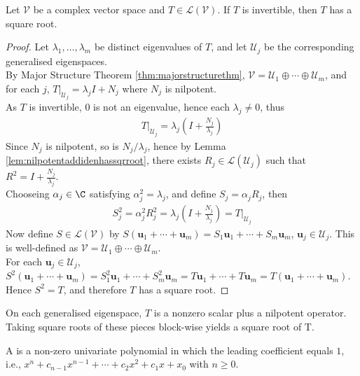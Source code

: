 \begin{theorem} Let $\mathcal{V}$ be a complex vector space and $T \in \mathcal{L}(\mathcal{V})$. If $T$ is invertible, then $T$ has a square root.
\begin{proof} Let $\lambda_1, \ldots, \lambda_m$ be distinct eigenvalues of $T$, and let $\mathcal{U}_j$ be the corresponding generalised eigenspaces.\\
By Major Structure Theorem \ref{thm:majorstructurethm}, $\mathcal{V} = \mathcal{U}_1 \oplus \cdots \oplus \mathcal{U}_m$, and for each $j$, $T|_{\mathcal{U}_j} = \lambda_j I + N_j$ where $N_j$ is nilpotent.\\
 As $T$ is invertible, $0$ is not an eigenvalue, hence each $\lambda_j \neq 0$, thus
\begin{align}
T|_{\mathcal{U}_j} = \lambda_j \left(I + \frac{N_j}{\lambda_j} \right) \nonumber
\end{align}
Since $N_j$ is nilpotent, so is $N_j/\lambda_j$, hence by Lemma \ref{lem:nilpotentaddidenhassqrroot}, there exists $R_j \in \mathcal{L}(\mathcal{U}_j)$ such that $R^2 = I + \frac{N_j}{\lambda_j}$.\\
Chooseing $\alpha_j \in \C$ satisfying $\alpha_j^2 = \lambda_j$, and define $S_j = \alpha_j R_j$, then
\begin{align}
S_j^2 = \alpha_j^2 R_j^2 = \lambda_j \left( I + \frac{N_j}{\lambda_j} \right) = T|_{\mathcal{U}_j} \nonumber
\end{align}
Now define $S \in \mathcal{L}(\mathcal{V})$ by $S(\mathbf{u}_1 + \cdots + \mathbf{u}_m) = S_1 \mathbf{u}_1 + \cdots + S_m \mathbf{u}_m$, $\mathbf{u}_j \in \mathcal{U}_j$. This is well-defined as $\mathcal{V} = \mathcal{U}_1 \oplus \cdots \oplus \mathcal{U}_m$.\\
For each $\mathbf{u}_j \in \mathcal{U}_j$, $S^2(\mathbf{u}_1 + \cdots + \mathbf{u}_m) = S_1^2 \mathbf{u}_1 + \cdots + S_m^2 \mathbf{u}_m = T \mathbf{u}_1 + \cdots + T \mathbf{u}_m = T (\mathbf{u}_1 + \cdots + \mathbf{u}_m)$.\\
Hence $S^2 = T$, and therefore $T$ has a square root.
\end{proof}
\end{theorem}

On each generalised eigenspace, $T$ is a nonzero scalar plus a nilpotent operator. Taking square roots of these pieces block-wise yields a square root of T.

\begin{definition} A  is a non-zero univariate polynomial in which the leading coefficient equals $1$, i.e., $x^n + c_{n-1} x^{n-1} + \cdots + c_2 x^2 + c_1 x + x_0$ with $n \geq 0$.
\end{definition}

